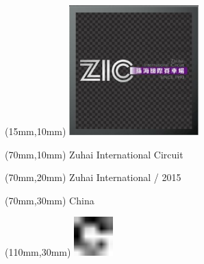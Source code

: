 \null\newpage
\begin{textblock*}{50mm}(15mm,10mm)%
\includegraphics[width=50mm]{LG/2015-05-20_00099.png}
\end{textblock*}
\begin{textblock*}{130mm}(70mm,10mm)%
{\fontsize{20}{20}\selectfont Zuhai International Circuit}\\
\end{textblock*}
\begin{textblock*}{120mm}(70mm,20mm)%
{\fontsize{16}{16}\selectfont Zuhai International / 2015}\\
\end{textblock*}
\begin{textblock*}{120mm}(70mm,30mm)%
{\fontsize{12}{12}\selectfont China}
\end{textblock*}
\begin{textblock*}{30mm}(110mm,30mm)%
\centering
\includegraphics[height=15mm]{icons/fa-rotate-right.pdf}
\end{textblock*}
